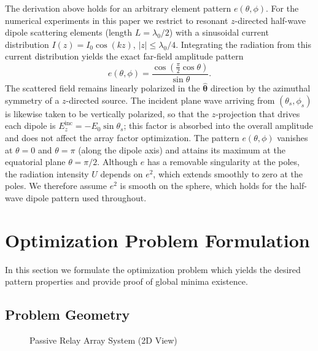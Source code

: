\documentclass[11pt,letterpaper]{article}
\theoremstyle{definition}
\theoremstyle{plain}
\begin{document}
The derivation above holds for an arbitrary element pattern $e(\theta,\phi)$.
For the numerical experiments in this paper we restrict to resonant $z$-directed
half-wave dipole scattering elements (length $L = \lambda_0/2$) with a sinusoidal
current distribution $I(z) = I_0 \cos(kz)$, $|z| \leq \lambda_0/4$.
Integrating the radiation from this current distribution yields the exact
far-field amplitude pattern~\cite{Balanis2016}
\begin{equation}
    e(\theta,\phi) = \frac{\cos\!\left(\tfrac{\pi}{2}\cos\theta\right)}{\sin\theta}.
    \label{eq:dipole}
\end{equation}
The scattered field remains linearly polarized in the $\hat{\boldsymbol{\theta}}$
direction by the azimuthal symmetry of a $z$-directed source. The incident plane
wave arriving from $(\theta_s,\phi_s)$ is likewise taken to be vertically polarized, so that the $z$-projection that drives each dipole is
$E^{\mathrm{inc}}_z = -E_0\sin\theta_s$; this factor is absorbed into the overall
amplitude and does not affect the array factor optimization. The pattern
$e(\theta,\phi)$ vanishes at $\theta = 0$ and $\theta = \pi$ (along the dipole
axis) and attains its maximum at the equatorial plane $\theta = \pi/2$. Although
$e$ has a removable singularity at the poles, the radiation intensity $U$ depends
on $e^2$, which extends smoothly to zero at the poles. We therefore assume $e^2$
is smooth on the sphere, which holds for the half-wave dipole pattern used
throughout.
\section{Optimization Problem Formulation}

In this section we formulate the optimization problem which yields the desired pattern properties and provide proof of global minima existence.

\subsection{Problem Geometry}

\begin{figure}[H]
\centering    
    
    \caption{Passive Relay Array System (2D View)}
    \label{fig:PRA_system_diagram}
\end{figure}
\end{document}
